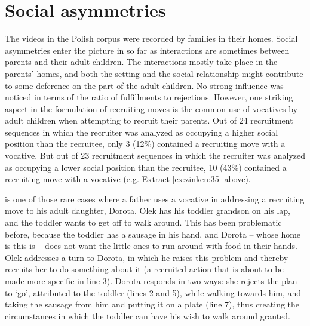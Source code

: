 \documentclass[output=paper]{langsci/langscibook}
\begin{document}
\section{Social asymmetries}\label{sec:zinken:6}
\largerpage
The videos in the Polish corpus were recorded by families in their homes. Social asymmetries enter the picture in so far as interactions are sometimes between parents and their adult children.  The interactions mostly take place in the parents’ homes, and both the setting and the social relationship might contribute to some deference on the part of the adult children.  No strong influence was noticed in terms of the ratio of fulfillments to rejections. However, one striking aspect in the formulation of recruiting moves is the common use of vocatives by adult children when attempting to recruit their parents. Out of 24 recruitment sequences in which the recruiter was analyzed as occupying a higher social position than the recruitee, only 3 (12\%) contained a recruiting move with a vocative.  But out of 23 recruitment sequences in which the recruiter was analyzed as occupying a lower social position than the recruitee, 10 (43\%) contained a recruiting move with a vocative (e.g. Extract \ref{ex:zinken:35} above).

 is one of those rare cases where a father uses a vocative in addressing a recruiting move to his adult daughter, Dorota.  Olek has his toddler grandson on his lap, and the toddler wants to get off to walk around. This has been problematic before, because the toddler has a sausage in his hand, and Dorota -- whose home is this is -- does not want the little ones to run around with food in their hands.  Olek addresses a turn to Dorota, in which he raises this problem and thereby recruits her to do something about it (a recruited action that is about to be made more specific in line 3).  Dorota responds in two ways: she rejects the plan to ‘go’, attributed to the toddler (lines 2 and 5), while walking towards him, and taking the sausage from him and putting it on a plate (line 7), thus creating the circumstances in which the toddler can have his wish to walk around granted.
\end{document}
